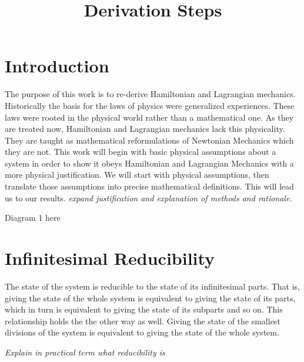 \documentclass{article}
\begin{document}
\title{Derivation Steps}

\section{Introduction}

	The purpose of this work is to re-derive Hamiltonian and Lagrangian mechanics. Historically the basis for the laws of physics were generalized experiences. These laws were rooted in the physical world rather than a mathematical one. As they are treated now, Hamiltonian and Lagrangian mechanics lack this physicality. They are taught as mathematical reformulations of Newtonian Mechanics which they are not. This work will begin with basic physical assumptions about a system in order to show it obeys Hamiltonian and Lagrangian Mechanics with a more physical justification. We will start with physical assumptions, then translate those assumptions into precise mathematical definitions. This will lead us to our results. \emph{expand justification and explanation of methods and rationale.}
	
Diagram 1 here

\section{Infinitesimal Reducibility}
	
\begin{assump}
	The state of the system is reducible to the state of its infinitesimal parts. That is, giving the state of the whole system is equivalent to giving the state of its parts, which in turn is equivalent to giving the state of its subparts and so on. This relationship holds the the other way as well. Giving the state of the smallest divisions of the system is equivalent to giving the state of the whole system.
\end{assump}

	
	\emph{Explain in practical term what reducibility is}
	
\end{document}
